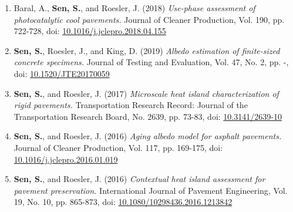 \documentclass[12pt]{article}
\begin{document}
\begin{enumerate}[label=(J\arabic*)]
	\item Baral, A., \textbf{Sen, S.}, and Roesler, J. (2018) \textit{Use-phase assessment of photocatalytic cool pavements.}  Journal of Cleaner Production, Vol. 190, pp. 722-728, doi: \href{https://doi.org/10.1016/j.jclepro.2018.04.155}{10.1016/j.jclepro.2018.04.155}
	\item \textbf{Sen, S.}, Roesler, J., and King, D. (2019) \textit{Albedo estimation of finite-sized concrete specimens.} Journal of Testing and Evaluation, Vol. 47, No. 2, pp. -, doi: \href{https://doi.org/10.1520/JTE20170059}{10.1520/JTE20170059}
	\item \textbf{Sen, S.}, and Roesler, J. (2017) \textit{Microscale heat island characterization of rigid pavements.} Transportation Research Record: Journal of the Transportation Research Board, No. 2639, pp. 73-83, doi: \href{http://dx.doi.org/10.3141/2639-10}{10.3141/2639-10}
	\item \textbf{Sen, S.}, and Roesler, J. (2016) \textit{Aging albedo model for asphalt pavements.} Journal of Cleaner Production, Vol. 117, pp. 169-175, doi: \href{http://dx.doi.org/10.1016/j.jclepro.2016.01.019}{10.1016/j.jclepro.2016.01.019}
	\item \textbf{Sen, S.}, and Roesler, J. (2016) \textit{Contextual heat island assessment for pavement preservation.} International Journal of Pavement Engineering, Vol. 19, No. 10, pp. 865-873, doi: \href{https://www.tandfonline.com/doi/full/10.1080/10298436.2016.1213842}{10.1080/10298436.2016.1213842}
\end{enumerate} 

\hfill
\end{document}
